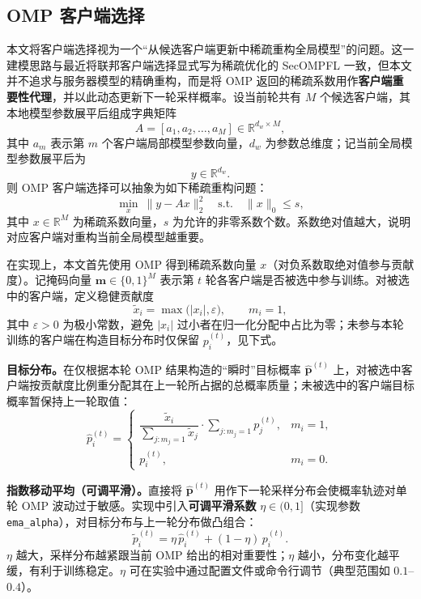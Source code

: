 \documentclass{article}
\begin{document}
\subsection{OMP 客户端选择}

本文将客户端选择视为一个“从候选客户端更新中稀疏重构全局模型”的问题。这一建模思路与最近将联邦客户端选择显式写为稀疏优化的 SecOMPFL\cite{secompfl} 一致，但本文并不追求与服务器模型的精确重构，而是将 OMP 返回的稀疏系数用作\textbf{客户端重要性代理}，并以此动态更新下一轮采样概率。设当前轮共有 $M$ 个候选客户端，其本地模型参数展平后组成字典矩阵
\begin{equation}
A = [a_1,a_2,\dots,a_M]\in \mathbb{R}^{d_w\times M},
\end{equation}
其中 $a_m$ 表示第 $m$ 个客户端局部模型参数向量，$d_w$ 为参数总维度；记当前全局模型参数展平后为
\begin{equation}
y\in \mathbb{R}^{d_w}.
\end{equation}
则 OMP 客户端选择可以抽象为如下稀疏重构问题：
\begin{equation}
\min_{x}\ \|y-Ax\|_2^2\quad
\text{s.t.}\quad \|x\|_0 \leq s,
\end{equation}
其中 $x\in \mathbb{R}^{M}$ 为稀疏系数向量，$s$ 为允许的非零系数个数。系数绝对值越大，说明对应客户端对重构当前全局模型越重要。

在实现上，本文首先使用 OMP 得到稀疏系数向量 $x$（对负系数取绝对值参与贡献度）。记掩码向量 $\bm{m}\in\{0,1\}^M$ 表示第 $t$ 轮各客户端是否被选中参与训练。对被选中的客户端，定义稳健贡献度
\begin{equation}
\tilde{x}_i = \max\bigl(|x_i|,\varepsilon\bigr),\qquad m_i=1,
\end{equation}
其中 $\varepsilon>0$ 为极小常数，避免 $|x_i|$ 过小者在归一化分配中占比为零；未参与本轮训练的客户端在构造目标分布时仅保留 $p_i^{(t)}$，见下式。

\textbf{目标分布。}在仅根据本轮 OMP 结果构造的“瞬时”目标概率 $\hat{\bm{p}}^{(t)}$ 上，对被选中客户端按贡献度比例重分配其在上一轮所占据的总概率质量；未被选中的客户端目标概率暂保持上一轮取值：
\begin{equation}
\hat{p}_i^{(t)} =
\begin{cases}
\dfrac{\tilde{x}_i}{\sum_{j:m_j=1}\tilde{x}_j}\cdot \displaystyle\sum_{j:m_j=1}p_j^{(t)}, & m_i=1,\\[1.2ex]
p_i^{(t)}, & m_i=0.
\end{cases}
\end{equation}

\textbf{指数移动平均（可调平滑）。}直接将 $\hat{\bm{p}}^{(t)}$ 用作下一轮采样分布会使概率轨迹对单轮 OMP 波动过于敏感。实现中引入\textbf{可调平滑系数} $\eta\in(0,1]$（实现参数 \texttt{ema\_alpha}），对目标分布与上一轮分布做凸组合：
\begin{equation}
\tilde{p}_i^{(t)}=\eta\,\hat{p}_i^{(t)}+(1-\eta)\,p_i^{(t)}.
\end{equation}
$\eta$ 越大，采样分布越紧跟当前 OMP 给出的相对重要性；$\eta$ 越小，分布变化越平缓，有利于训练稳定。$\eta$ 可在实验中通过配置文件或命令行调节（典型范围如 $0.1$--$0.4$）。
\end{document}
